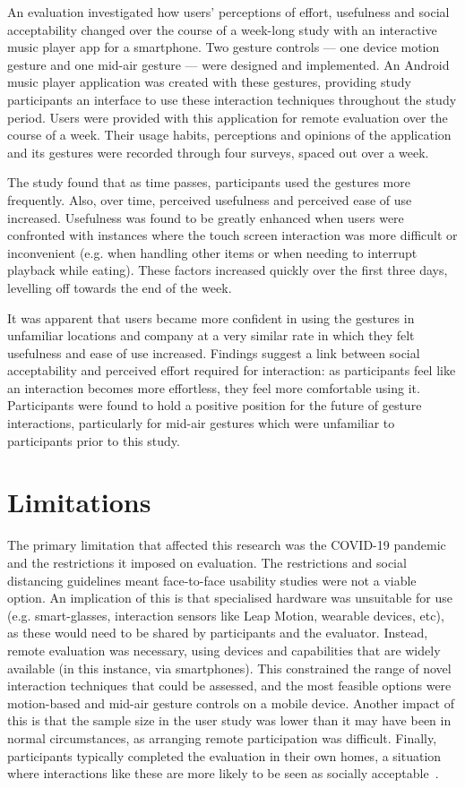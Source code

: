 \documentclass{l4proj}
\begin{document}
An evaluation investigated how users’ perceptions of effort, usefulness and social acceptability changed over the course of a week-long study with an interactive music player app for a smartphone. Two gesture controls --- one device motion gesture and one mid-air gesture --- were designed and implemented. An Android music player application was created with these gestures, providing study participants an interface to use these interaction techniques throughout the study period. Users were provided with this application for remote evaluation over the course of a week. Their usage habits, perceptions and opinions of the application and its gestures were recorded through four surveys, spaced out over a week.

The study found that as time passes, participants used the gestures more frequently. Also, over time, perceived usefulness and perceived ease of use increased. Usefulness was found to be greatly enhanced when users were confronted with instances where the touch screen interaction was more difficult or inconvenient (e.g. when handling other items or when needing to interrupt playback while eating). These factors increased quickly over the first three days, levelling off towards the end of the week.

It was apparent that users became more confident in using the gestures in unfamiliar locations and company at a very similar rate in which they felt usefulness and ease of use increased. Findings suggest a link between social acceptability and perceived effort required for interaction: as participants feel like an interaction becomes more effortless, they feel more comfortable using it. Participants were found to hold a positive position for the future of gesture interactions, particularly for mid-air gestures which were unfamiliar to participants prior to this study.


\section{Limitations}
The primary limitation that affected this research was the COVID-19 pandemic and the restrictions it imposed on evaluation. The restrictions and social distancing guidelines meant face-to-face usability studies were not a viable option. An implication of this is that specialised hardware was unsuitable for use (e.g. smart-glasses, interaction sensors like Leap Motion, wearable devices, etc), as these would need to be shared by participants and the evaluator. Instead, remote evaluation was necessary, using devices and capabilities that are widely available (in this instance, via smartphones). This constrained the range of novel interaction techniques that could be assessed, and the most feasible options were motion-based and mid-air gesture controls on a mobile device. Another impact of this is that the sample size in the user study was lower than it may have been in normal circumstances, as arranging remote participation was difficult. Finally, participants typically completed the evaluation in their own homes, a situation where interactions like these are more likely to be seen as socially acceptable~\citet{rico_usable_2010}.
\end{document}
